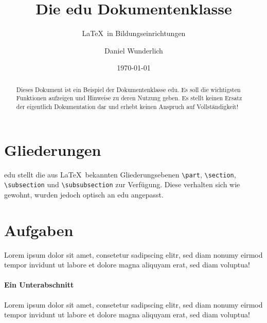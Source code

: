 \documentclass[
parindent=false,
parskip=true,
parts=true,
colortheme=wu,
styletheme=wu,
shownotess=true,
showresults=false
]{edu}
\title[edu Dokumentenklasse]{Die edu Dokumentenklasse}
\subtitle{\LaTeX\ in Bildungseinrichtungen}
\author[D. Wunderlich]{Daniel Wunderlich}
\date[\today*]{\today}
\begin{document}
\makeheader

\maketitle

\begin{abstract}
  Dieses Dokument ist ein Beispiel der Dokumentenklasse \textsf{edu}. Es soll die wichtigsten Funktionen aufzeigen und Hinweise zu deren Nutzung geben. Es stellt keinen Ersatz der eigentlich Dokumentation dar und erhebt keinen Anspruch auf Vollständigkeit!
\end{abstract}

\tableofcontents


\part{Gliederungen}

\textsf{edu} stellt die aus \LaTeX\ bekannten Gliederungsebenen \lstinline!\part!, \lstinline!\section!, \lstinline!\subsection! und \lstinline!\subsubsection! zur Verfügung. Diese verhalten sich wie gewohnt, wurden jedoch optisch an \textsf{edu} angepasst.

\part{Aufgaben}




Lorem ipsum dolor sit amet, consetetur sadipscing elitr, sed diam nonumy eirmod tempor invidunt ut labore et dolore magna aliquyam erat, sed diam voluptua!

\subsection{Ein Unterabschnitt}

Lorem ipsum dolor sit amet, consetetur sadipscing elitr, sed diam nonumy eirmod tempor invidunt ut labore et dolore magna aliquyam erat, sed diam voluptua!
\end{document}
